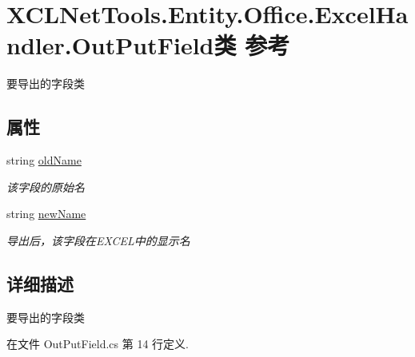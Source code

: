 \hypertarget{class_x_c_l_net_tools_1_1_entity_1_1_office_1_1_excel_handler_1_1_out_put_field}{\section{X\-C\-L\-Net\-Tools.\-Entity.\-Office.\-Excel\-Handler.\-Out\-Put\-Field类 参考}
\label{class_x_c_l_net_tools_1_1_entity_1_1_office_1_1_excel_handler_1_1_out_put_field}
}


要导出的字段类  


\subsection*{属性}
\begin{DoxyCompactItemize}
\item 
string \hyperlink{class_x_c_l_net_tools_1_1_entity_1_1_office_1_1_excel_handler_1_1_out_put_field_a6f62cc17246410ac6f6a352cd04bc1a2}{old\-Name}
\begin{DoxyCompactList}\small\item\em 该字段的原始名 \end{DoxyCompactList}\item 
string \hyperlink{class_x_c_l_net_tools_1_1_entity_1_1_office_1_1_excel_handler_1_1_out_put_field_a5889d2738a4a65d809b67457e37429fd}{new\-Name}
\begin{DoxyCompactList}\small\item\em 导出后，该字段在\-E\-X\-C\-E\-L中的显示名 \end{DoxyCompactList}\end{DoxyCompactItemize}


\subsection{详细描述}
要导出的字段类 



在文件 Out\-Put\-Field.\-cs 第 14 行定义.



